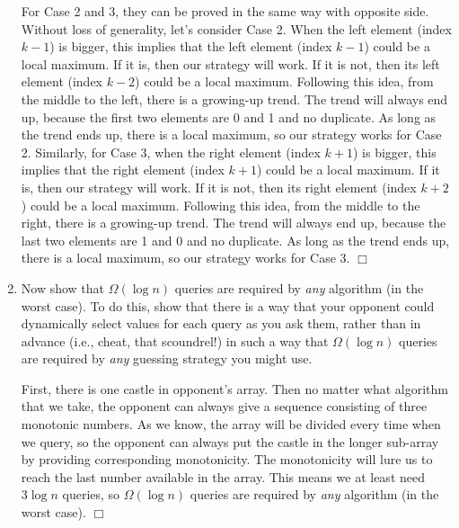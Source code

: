 \documentclass[10pt]{article}
\newenvironment{proof}{\par\noindent{\it Proof.}\hspace*{1em}}{$\Box$\bigskip}
\begin{document}
\begin{enumerate}
\begin{proof}
    For Case 2 and 3, they can be proved in the same way with opposite side. Without loss of generality, let's consider Case 2. When the left element (index $k-1$) is bigger, this implies that the left element (index $k-1$) could be a local maximum. If it is, then our strategy will work. If it is not, then its left element (index $k-2$) could be a local maximum. Following this idea, from the middle to the left, there is a growing-up trend. The trend will always end up, because the first two elements are 0 and 1 and no duplicate. As long as the trend ends up, there is a local maximum, so our strategy works for Case 2. Similarly, for Case 3, when the right element (index $k+1$) is bigger, this implies that the right element (index $k+1$) could be a local maximum. If it is, then our strategy will work. If it is not, then its right element (index $k+2$) could be a local maximum. Following this idea, from the middle to the right, there is a growing-up trend. The trend will always end up, because the last two elements are 1 and 0 and no duplicate. As long as the trend ends up, there is a local maximum, so our strategy works for Case 3.
    \end{proof}
    
    \item Now show that $\Omega(\log n)$ queries are required by \emph{any} algorithm (in the worst case). To do this, show that there is a way that your opponent could dynamically select values for each query as you ask them, rather than in advance (i.e., cheat, that scoundrel!) in such a way that $\Omega(\log n)$ queries are required by \emph{any} guessing strategy you might use.
    \begin{proof}
    First, there is one castle in opponent's array. Then no matter what algorithm that we take, the opponent can always give a sequence consisting of three monotonic numbers. As we know, the array will be divided every time when we query, so the opponent can always put the castle in the longer sub-array by providing corresponding monotonicity. The monotonicity will lure us to reach the last number available in the array. This means we at least need $3\log n$ queries, so $\Omega(\log n)$ queries are required by \emph{any} algorithm (in the worst case).
    \end{proof}
\end{enumerate}


%
%
\end{document}
